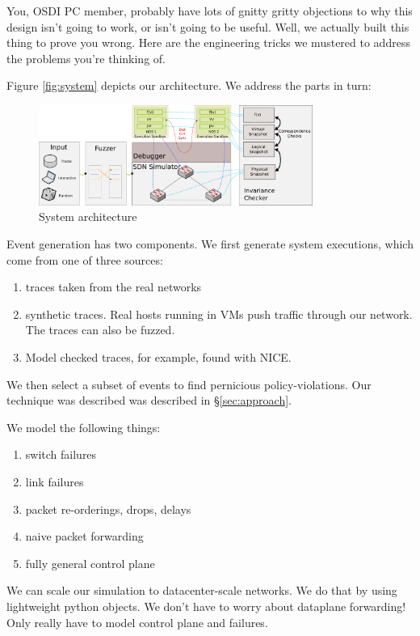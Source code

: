 
You, OSDI PC member, probably have lots of gnitty gritty objections to why
this design isn't going to work, or isn't going to be useful. Well, we actually built this thing to prove
you wrong. Here are the engineering tricks we mustered to address the problems
you're thinking of.

Figure \ref{fig:system} depicts our architecture. We address the parts in turn:
\begin{figure}[!t]
  \centering
  \includegraphics[width=0.8\textwidth]{../diagrams/architecture/architecture.pdf}
  \caption{System architecture}
  \label{fig:parallel_drops_master}
\end{figure}

 Event generation has two components.
We first generate system executions, which come from one of three sources:
\begin{enumerate}
\item traces taken from the real networks
\item synthetic traces. Real hosts running in VMs push traffic through our
network. The traces can also be fuzzed. 
\item Model checked traces, for example, found with NICE.
\end{enumerate}

We then select a subset of events to find pernicious policy-violations. Our
technique was described was described in \S\ref{sec:approach}.

 We model the following things: 
\begin{enumerate}
\item switch failures
\item link failures
\item packet re-orderings, drops, delays
\item naive packet forwarding
\item fully general control plane
\end{enumerate}

We can scale our simulation to datacenter-scale networks. We do that by using lightweight python objects. We don't have to worry
about dataplane forwarding! Only really have to model control plane and failures.

